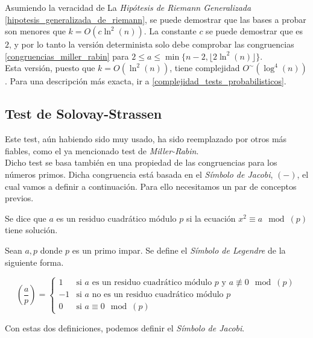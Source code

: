 Asumiendo la veracidad de La \textit{Hipótesis de Riemann Generalizada} \autoref{hipotesis_generalizada_de_riemann}, se puede demostrar que las bases a probar son menores que $k = O(c\ln^2(n))$. La constante $c$ se puede demostrar que es $2$, y por lo tanto la versión determinista solo debe comprobar las congruencias \eqref{congruencias_miller_rabin} para $2 \leq a \leq \min\{n-2, \lfloor 2\ln^2(n) \rfloor\}$.\\

Esta versión, puesto que $k = O(\ln^2(n))$, tiene complejidad $O^\sim(\log^4(n))$. Para una descripción más exacta, ir a \autoref{complejidad_tests_probabilisticos}.

\subsection{Test de Solovay-Strassen}

Este test, aún habiendo sido muy usado, ha sido reemplazado por otros más fiables, como el ya mencionado test de \textit{Miller-Rabin}.\\

Dicho test se basa también en una propiedad de las congruencias para los números primos. Dicha congruencia está basada en el \textit{Símbolo de Jacobi}, $(-)$, el cual vamos a definir a continuación. Para ello necesitamos un par de conceptos previos.

\begin{definicion}
	Se dice que $a$ es un residuo cuadrático módulo $p$ si la ecuación $x^2 \equiv a \mod(p)$ tiene solución.
\end{definicion}

\begin{definicion}\label{simbolo_de_legendre}
	Sean $a, p$ donde $p$ es un primo impar. Se define el \textit{Símbolo de Legendre} de la siguiente forma.
	
	\begin{equation}
	\left(\frac{a}{p}\right) =
	\begin{cases}
		1 &\text{si $a$ es un residuo cuadrático módulo $p$ y $a \not\equiv 0 \mod(p)$}\\
		-1 &\text{si $a$ no es un residuo cuadrático módulo $p$}\\
		0 &\text{si $a \equiv 0 \mod(p)$}
	\end{cases}
	\end{equation}
\end{definicion}

Con estas dos definiciones, podemos definir el \textit{Símbolo de Jacobi}.

